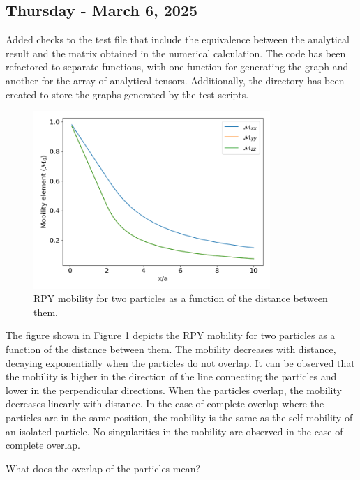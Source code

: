 \documentclass[12pt]{article} %
\begin{document}
\subsection{Thursday - March 6, 2025}
Added checks to the test file  that
include the equivalence between the analytical result and the matrix
obtained in the numerical calculation. The code has been refactored
to separate functions, with one function for generating the graph and
another for the array of analytical tensors. Additionally, the
 directory has been created to store the graphs generated
by the test scripts.
\begin{figure}[h]
    \centering
    \includegraphics[width=0.8\textwidth]{figures/RPY_mobility_tensor_distance_dependence_.png}
    \caption{RPY mobility for two particles as a function of the distance between them.}
    \label{fig:RPY_mobility_tensor_distance_dependence}
\end{figure}
The figure shown in Figure \ref{fig:RPY_mobility_tensor_distance_dependence}
depicts the RPY mobility for two particles as a function of the distance
between them. The mobility decreases with distance, decaying exponentially
when the particles do not overlap. It can be observed that the mobility is
higher in the direction of the line connecting the particles and lower in
the perpendicular directions. When the particles overlap, the mobility
decreases linearly with distance. In the case of complete overlap where
the particles are in the same position, the mobility is the same as the
self-mobility of an isolated particle. No singularities in the mobility
are observed in the case of complete overlap.

\begin{tcolorbox}[colback=blue!5!white, colframe=blue!20!black, title=Doubt, colbacktitle=blue!20!white, coltitle=black]
    What does the overlap of the particles mean?
\end{tcolorbox}
\end{document}
